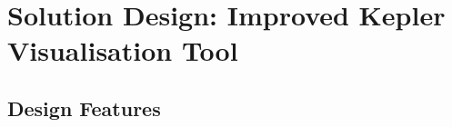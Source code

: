 \chapter{Solution Design: Improved Kepler Visualisation Tool}\label{C:sd}

\section{Design Features}
